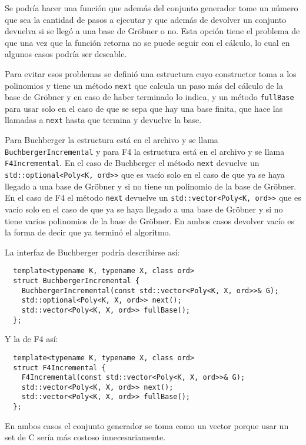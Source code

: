 \documentclass[12pt]{report}
\theoremstyle{customstyle}
\theoremstyle{factstyle}
\newcommand\cpp{C\nolinebreak[4]\hspace{-.05em}\raisebox{.4ex}{\relsize{-3}{\textbf{++}}}\xspace}
\begin{document}
Se podría hacer una función que además del conjunto generador tome un número que sea la cantidad de pasos a ejecutar y que además de devolver un conjunto devuelva si se llegó a una base de Gröbner o no. Esta opción tiene el problema de que una vez que la función retorna no se puede seguir con el cálculo, lo cual en algunos casos podría ser deseable.

Para evitar esos problemas se definió una estructura cuyo constructor toma a los polinomios y tiene un método \texttt{next} que calcula un paso más del cálculo de la base de Gröbner y en caso de haber terminado lo indica, y un método \texttt{fullBase} para usar solo en el caso de que se sepa que hay una base finita, que hace las llamadas a \texttt{next} hasta que termina y devuelve la base.

Para Buchberger la estructura está en el archivo  y se llama \texttt{BuchbergerIncremental} y para F4 la estructura está en el archivo  y se llama \texttt{F4Incremental}. En el caso de Buchberger el método \texttt{next} devuelve un \texttt{std::optional<Poly<K, ord>>} que es vacío solo en el caso de que ya se haya llegado a una base de Gröbner y si no tiene un polinomio de la base de Gröbner. En el caso de F4 el método \texttt{next} devuelve un \texttt{std::vector<Poly<K, ord>>} que es vacío solo en el caso de que ya se haya llegado a una base de Gröbner y si no tiene varios polinomios de la base de Gröbner. En ambos casos devolver vacío es la forma de decir que ya terminó el algoritmo.

La interfaz de Buchberger podría describirse así:

\begin{verbatim}
  template<typename K, typename X, class ord>
  struct BuchbergerIncremental {
    BuchbergerIncremental(const std::vector<Poly<K, X, ord>>& G);
    std::optional<Poly<K, X, ord>> next();
    std::vector<Poly<K, X, ord>> fullBase();
  };
\end{verbatim}

Y la de F4 así:

\begin{verbatim}
  template<typename K, typename X, class ord>
  struct F4Incremental {
    F4Incremental(const std::vector<Poly<K, X, ord>>& G);
    std::vector<Poly<K, X, ord>> next();
    std::vector<Poly<K, X, ord>> fullBase();
  };
\end{verbatim}

En ambos casos el conjunto generador se toma como un vector porque usar un set de \cpp sería más costoso innecesariamente.
\end{document}
